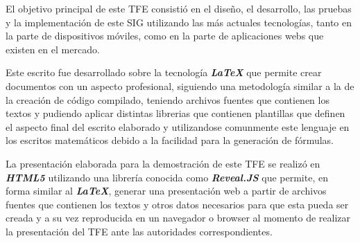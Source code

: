 El objetivo principal de este \ac{TFE} consisti\'o en el dise\~no, el desarrollo, las pruebas y la implementaci\'on de este \ac{SIG} utilizando las m\'as actuales tecnolog\'ias, tanto en la parte de dispositivos m\'oviles, como en la parte de aplicaciones webs que existen en el mercado.

Este escrito fue desarrollado sobre la tecnolog\'ia \textbf{\textit{LaTeX}} que permite crear documentos con un aspecto profesional, siguiendo una metodolog\'ia similar a la de la creaci\'on de c\'odigo compilado, teniendo archivos fuentes que contienen los textos y pudiendo aplicar distintas librerias que contienen plantillas que definen el aspecto final del escrito elaborado y utilizandose comunmente este lenguaje en los escritos matem\'aticos debido a la facilidad para la generaci\'on de f\'ormulas.

La presentaci\'on elaborada para la demostraci\'on de este \ac{TFE} se realiz\'o en \textbf{\textit{HTML5}} utilizando una librer\'ia conocida como \textbf{\textit{Reveal.JS}} que permite, en forma similar al \textbf{\textit{LaTeX}}, generar una presentaci\'on web a partir de archivos fuentes que contienen los textos y otros datos necesarios para que esta pueda ser creada y a su vez reproducida en un navegador o browser al momento de realizar la presentaci\'on del \ac{TFE} ante las autoridades correspondientes.

